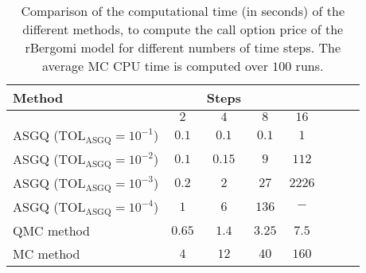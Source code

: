 \FloatBarrier
\begin{table}[h!]
	\centering
	\begin{tabular}{l*{6}{c}r}
		\toprule[1.5pt]
		Method & & Steps  & &     \\
		\hline	
		& $2$ & $4$ & $8$ & $16$ &   \\
		\hline
		ASGQ ($\text{TOL}_{\text{ASGQ}}=10^{-1}$)  & $0.1$ & $0.1$ & $0.1$ & $1$ \\
		ASGQ ($\text{TOL}_{\text{ASGQ}}=10^{-2}$)  & $0.1$ & $0.15$ & $9$ & $112$ \\
		ASGQ ($\text{TOL}_{\text{ASGQ}}=10^{-3}$)  & $0.2$ & $2$ & $27$ & $2226$ \\
		ASGQ ($\text{TOL}_{\text{ASGQ}}=10^{-4}$)  & $1$ & $6$ & $136$ & $-$\\
		\hline
		QMC method    & $0.65$  & $ 1.4$  & $  3.25$ & $ 7.5
		$  \\	
		\hline
		MC method   & $4$  & $ 12$  & $  40$ & $ 160
		$  \\	
		\bottomrule[1.25pt]
	\end{tabular}
	\caption{Comparison of the computational time (in seconds) of the different methods,  to compute the call option price of the rBergomi model for different numbers of time steps. The average  MC CPU time is computed over $100$ runs. }
	\label{Comparsion of the computational time of  MC and MISC, used to compute Call option price of rBergomi model for different number of time steps. Case set4}
\end{table}


\FloatBarrier

